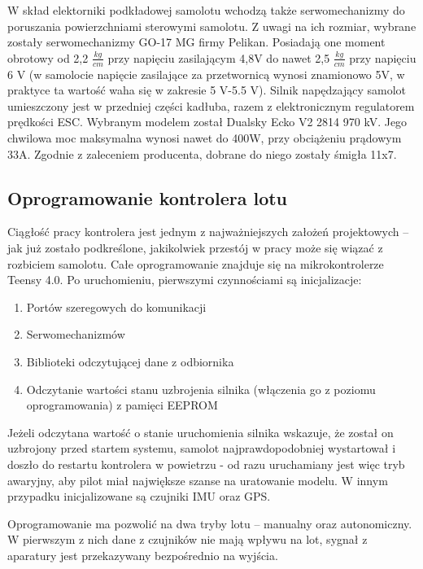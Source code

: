 \documentclass[12pt, a4paper]{article}
\begin{document}
W skład elektorniki podkładowej samolotu wchodzą także serwomechanizmy do poruszania powierzchniami sterowymi samolotu. Z uwagi na ich rozmiar, wybrane zostały serwomechanizmy GO-17 MG firmy Pelikan. Posiadają one moment obrotowy od 2,2 $\frac{kg}{cm}$ przy napięciu zasilającym 4,8V do nawet 2,5 $\frac{kg}{cm}$ przy napięciu 6 V (w samolocie napięcie zasilające za przetwornicą wynosi znamionowo 5V, w praktyce ta wartość waha się w zakresie 5 V-5.5 V). Silnik napędzający samolot umieszczony jest w przedniej części kadłuba, razem z elektronicznym regulatorem prędkości ESC. Wybranym modelem został Dualsky Ecko V2 2814 970 kV. Jego chwilowa moc maksymalna wynosi nawet do 400W, przy obciążeniu prądowym 33A. Zgodnie z zaleceniem producenta, dobrane do niego zostały śmigła 11x7.  

 \clearpage
\subsection{Oprogramowanie kontrolera lotu}
Ciągłość pracy kontrolera jest jednym z najważniejszych założeń projektowych – jak już zostało podkreślone, jakikolwiek przestój w pracy może się wiązać z rozbiciem samolotu. Całe oprogramowanie znajduje się na mikrokontrolerze Teensy 4.0. Po uruchomieniu, pierwszymi czynnościami są inicjalizacje:
\begin{enumerate}

\item Portów szeregowych do komunikacji
\item Serwomechanizmów 
\item Biblioteki odczytującej dane z odbiornika
\item Odczytanie wartości stanu uzbrojenia silnika (włączenia go z poziomu oprogramowania) z pamięci EEPROM

\end{enumerate}

Jeżeli odczytana wartość o stanie uruchomienia silnika wskazuje, że został on uzbrojony przed startem systemu, samolot najprawdopodobniej wystartował i doszło do restartu kontrolera w powietrzu - od razu uruchamiany jest więc tryb awaryjny, aby pilot miał największe szanse na uratowanie modelu. W innym przypadku inicjalizowane są czujniki IMU oraz GPS.

Oprogramowanie ma pozwolić na dwa tryby lotu – manualny oraz autonomiczny. W pierwszym z nich dane z czujników nie mają wpływu na lot, sygnał z aparatury jest przekazywany bezpośrednio na wyjścia.
 
\end{document}
